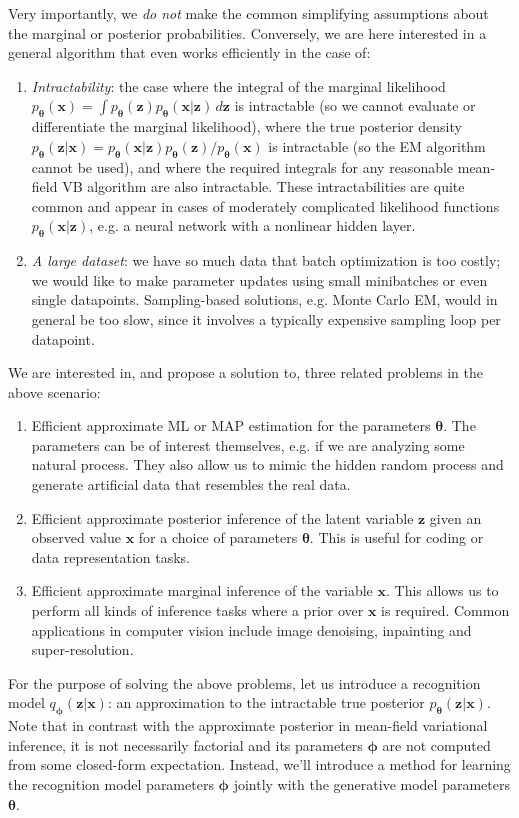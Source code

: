 \documentclass{article} %
\theoremstyle{definition}
\newcommand{\bb}[1]{\mathbf{#1}}
\newcommand{\bx}{\bb{x}}
\newcommand{\bz}{\bb{z}}
\newcommand{\bT}{\boldsymbol{\theta}}
\newcommand{\bphi}{\boldsymbol{\phi}}
\newcommand{\pT}{p_{\bT}}
\newcommand{\qPhi}{q_{\bphi}}
\theoremstyle{definition}
\begin{document}
Very importantly, we \emph{do not} make the common simplifying assumptions about the marginal or posterior probabilities. Conversely, we are here interested in a general algorithm that even works efficiently in the case of:
\begin{enumerate}
\item \emph{Intractability}: the case where the integral of the marginal likelihood $\pT(\bx) = \int \pT(\bz) \pT(\bx|\bz) \,d\bz$ is intractable (so we cannot evaluate or differentiate the marginal likelihood), where the true posterior density $\pT(\bz|\bx) = \pT(\bx|\bz)\pT(\bz)/\pT(\bx)$ is intractable (so the EM algorithm cannot be used), and where the required integrals for any reasonable mean-field VB algorithm are also intractable. These intractabilities are quite common and appear in cases of moderately complicated likelihood functions $\pT(\bx|\bz)$, e.g. a neural network with a nonlinear hidden layer.
\item \emph{A large dataset}: we have so much data that batch optimization is too costly; we would like to make parameter updates using small minibatches or even single datapoints. Sampling-based solutions, e.g. Monte Carlo EM, would in general be too slow, since it involves a typically expensive sampling loop per datapoint.
\end{enumerate}

We are interested in, and propose a solution to, three related problems in the above scenario:
\begin{enumerate}
\item Efficient approximate ML or MAP estimation for the parameters $\bT$. The parameters can be of interest themselves, e.g. if we are analyzing some natural process. They also allow us to mimic the hidden random process and generate artificial data that resembles the real data.
\item Efficient approximate posterior inference of the latent variable $\bz$ given an observed value $\bx$ for a choice of parameters $\bT$. This is useful for coding or data representation tasks.
\item Efficient approximate marginal inference of the variable $\bx$. This allows us to perform all kinds of inference tasks where a prior over $\bx$ is required. Common applications in computer vision include image denoising, inpainting and super-resolution.
\end{enumerate}

For the purpose of solving the above problems, let us introduce a recognition model $\qPhi(\bz|\bx)$: an approximation to the intractable true posterior $\pT(\bz|\bx)$. Note that in contrast with the approximate posterior in mean-field variational inference, it is not necessarily factorial and its parameters $\bphi$ are not computed from some closed-form expectation. Instead, we'll introduce a method for learning the recognition model parameters $\bphi$ jointly with the generative model parameters $\bT$.
\end{document}
